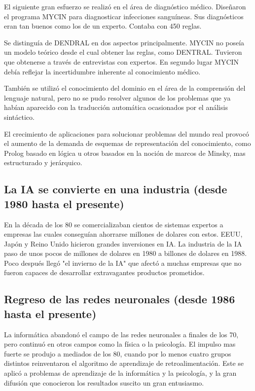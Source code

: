 \documentclass[12pt,a4paper]{article}
\begin{document}
El siguiente gran esfuerzo se realizó en el área de diagnóstico médico. Diseñaron el programa MYCIN para diagnosticar infecciones sanguíneas. Sus diagnósticos eran tan buenos como los de un experto. Contaba con 450 reglas.

Se distinguía de DENDRAL en dos aspectos principalmente. MYCIN no poseía un modelo teórico desde el cual obtener las reglas, como DENTRAL. Tuvieron que obtenerse a través de entrevistas con expertos. En segundo lugar MYCIN debía reflejar la incertidumbre inherente al conocimiento médico.

También se utilizó el conocimiento del dominio en el área de la comprensión del lenguaje natural, pero no se pudo resolver algunos de los problemas que ya habían aparecido con la traducción automática ocasionados por el análisis sintáctico.

El crecimiento de aplicaciones para solucionar problemas del mundo real provocó el aumento de la demanda de esquemas de representación del conocimiento, como Prolog basado en lógica u otros basados en la noción de marcos de Minsky, mas estructurado y jerárquico.

\subsection{La IA se convierte en una industria (desde 1980 hasta el presente)}

En la década de los 80 se comercializaban cientos de sistemas expertos a empresas las cuales conseguían ahorrarse millones de dolares con estos. EEUU, Japón y Reino Unido hicieron grandes inversiones en IA. La industria de la IA paso de unos pocos de millones de dolares en 1980 a billones de dolares en 1988. Poco después llegó "el invierno de la IA" que afectó a muchas empresas que no fueron capaces de desarrollar extravagantes productos prometidos.

\subsection{Regreso de las redes neuronales (desde 1986 hasta el presente)}
La informática abandonó el campo de las redes neuronales a finales de los 70, pero continuó en otros campos como la física o la psicología. El impulso mas fuerte se produjo a mediados de los 80, cuando por lo menos cuatro grupos distintos reinventaron el algoritmo de aprendizaje de retroalimentación. Este se aplicó a problemas de aprendizaje de la informática y la psicología, y la gran difusión que conocieron los resultados suscito un gran entusiasmo.
\end{document}
